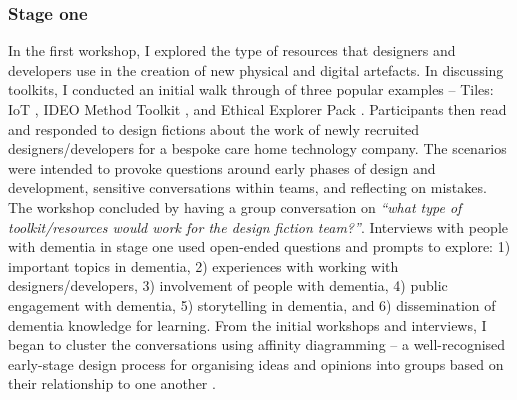 \subsubsection{Stage one}
In the first workshop, I explored the type of resources that designers and developers use in the creation of new physical and digital artefacts. In discussing toolkits, I conducted an initial walk through of three popular examples – Tiles: IoT \citep{mora2017tiles}, IDEO Method Toolkit \citep{fraga2020inclusive}, and Ethical Explorer Pack \citep{network_ethical_nodate}. Participants then read and responded to design fictions about the work of newly recruited designers/developers for a bespoke care home technology company. The scenarios were intended to provoke questions around early phases of design and development, sensitive conversations within teams, and reflecting on mistakes. The workshop concluded by having a group conversation on \textit{``what type of toolkit/resources would work for the design fiction team?''}.
Interviews with people with dementia in stage one used open-ended questions and prompts to explore: 1) important topics in dementia, 2) experiences with working with designers/developers, 3) involvement of people with dementia, 4) public engagement with dementia, 5) storytelling in dementia, and 6) dissemination of dementia knowledge for learning.
From the initial workshops and interviews, I began to cluster the conversations using affinity diagramming – a well-recognised early-stage design process for organising ideas and opinions into groups based on their relationship to one another \citep{lucero2015using}. 



